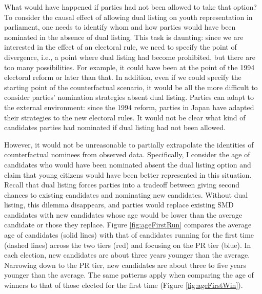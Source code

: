 \documentclass[a4paper, 11pt]{article}
\begin{document}
What would have happened if parties had not been allowed to take that option? To consider the causal effect of allowing dual listing on youth representation in parliament, one needs to identify whom and how parties would have been nominated in the absence of dual listing. This task is daunting: since we are interested in the effect of an electoral rule, we need to specify the point of divergence, i.e., a point where dual listing had become prohibited, but there are too many possibilities. For example, it could have been at the point of the 1994 electoral reform or later than that. In addition, even if we could specify the starting point of the counterfactual scenario, it would be all the more difficult to consider parties' nomination strategies absent dual listing. Parties can adapt to the external environment: since the 1994 reform, parties in Japan have adapted their strategies to the new electoral rules. It would not be clear what kind of candidates parties had nominated if dual listing had not been allowed. 

However, it would not be unreasonable to partially extrapolate the identities of counterfactual nominees from observed data. Specifically, I consider the age of candidates who would have been nominated absent the dual listing option and claim that young citizens would have been better represented in this situation. Recall that dual listing forces parties into a tradeoff between giving second chances to existing candidates and nominating new candidates. Without dual listing, this dilemma disappears, and parties would replace existing SMD candidates with new candidates whose age would be lower than the average candidate or those they replace. Figure \ref{fig:ageFirstRun} compares the average age of candidates (solid lines) with that of candidates running for the first time (dashed lines) across the two tiers (red) and focusing on the PR tier (blue). In each election, new candidates are about three years younger than the average. Narrowing down to the PR tier, new candidates are about three to five years younger than the average. The same patterns apply when comparing the age of winners to that of those elected for the first time (Figure \ref{fig:ageFirstWin}). 
\end{document}
